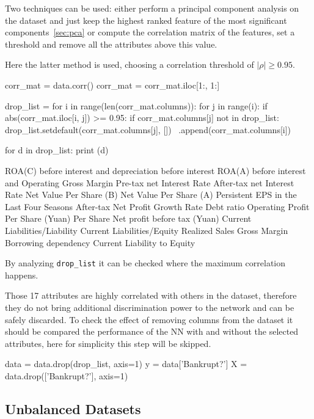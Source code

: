 Two techniques can be used: either perform a principal component analysis on the dataset and just keep the highest ranked feature of the most significant components~\ref{sec:pca} or compute the correlation matrix of the features, set a threshold and remove all the attributes above this value.

Here the latter method is used, choosing a correlation threshold of $|\rho|\geq 0.95$.

\begin{ipythonnon}
corr_mat = data.corr()
corr_mat = corr_mat.iloc[1:, 1:]
	
drop_list = {}
for i in range(len(corr_mat.columns)):
    for j in range(i):
        if abs(corr_mat.iloc[i, j]) >= 0.95:
            if corr_mat.columns[j] not in drop_list:
                drop_list.setdefault(corr_mat.columns[j], []) \
                    .append(corr_mat.columns[i])

for d in drop_list:
    print (d)
\end{ipythonnon}
\begin{ioutput}
ROA(C) before interest and depreciation before interest
ROA(A) before interest and %
Operating Gross Margin
Pre-tax net Interest Rate
After-tax net Interest Rate
Net Value Per Share (B)
Net Value Per Share (A)
Persistent EPS in the Last Four Seasons
After-tax Net Profit Growth Rate
Debt ratio %
Operating Profit Per Share (Yuan)
Per Share Net profit before tax (Yuan)
Current Liabilities/Liability
Current Liabilities/Equity
Realized Sales Gross Margin
Borrowing dependency
Current Liability to Equity
\end{ioutput}
\noindent 
By analyzing \texttt{drop\_list} it can be checked where the maximum correlation happens.

Those 17 attributes are highly correlated with others in the dataset, therefore they do not bring additional discrimination power to the network and can be safely discarded. To check the effect of removing columns from the dataset it should be compared the performance of the NN with and without the selected attributes, here for simplicity this step will be skipped.

\begin{ipythonnon}
data = data.drop(drop_list, axis=1)
y = data['Bankrupt?']
X = data.drop(['Bankrupt?'], axis=1)
\end{ipythonnon}

\subsection{Unbalanced Datasets}

